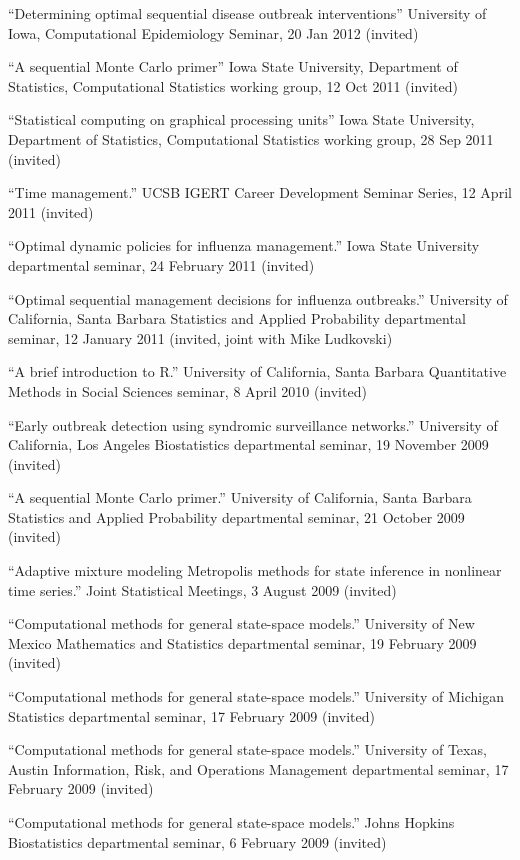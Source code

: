 \documentclass[overlapped,line]{res}
\newcommand{\sinceappt}{}
\begin{document}
\begin{resume}
{``Determining optimal sequential disease outbreak interventions'' University of Iowa, Computational Epidemiology Seminar, 20 Jan 2012 (invited)

\sinceappt

``A sequential Monte Carlo primer'' Iowa State University, Department of Statistics, Computational Statistics working group, 12 Oct 2011 (invited)

``Statistical computing on graphical processing units'' Iowa State University, Department of Statistics, Computational Statistics working group, 28 Sep 2011 (invited)

``Time management.'' UCSB IGERT Career Development Seminar Series, 12 April 2011 (invited)

``Optimal dynamic policies for influenza management.'' Iowa State University departmental seminar, 24 February 2011 (invited)

``Optimal sequential management decisions for influenza outbreaks.'' University of California, Santa Barbara Statistics and Applied Probability departmental seminar, 12 January 2011 (invited, joint with Mike Ludkovski)

``A brief introduction to R.'' University of California, Santa Barbara Quantitative Methods in Social Sciences seminar, 8 April 2010 (invited)

``Early outbreak detection using syndromic surveillance networks.'' University of California, Los Angeles Biostatistics departmental seminar, 19 November 2009 (invited)

``A sequential Monte Carlo primer.'' University of California, Santa Barbara Statistics and Applied Probability departmental seminar, 21 October 2009 (invited)

``Adaptive mixture modeling Metropolis methods for state inference in nonlinear time series.'' Joint Statistical Meetings, 3 August 2009 (invited)


``Computational methods for general state-space models.'' University of New Mexico Mathematics and Statistics departmental seminar, 19 February 2009 (invited)

``Computational methods for general state-space models.'' University of Michigan Statistics departmental seminar, 17 February 2009 (invited)

``Computational methods for general state-space models.'' University of Texas, Austin Information, Risk, and Operations Management departmental seminar, 17 February 2009 (invited)

``Computational methods for general state-space models.'' Johns Hopkins Biostatistics departmental seminar, 6 February 2009 (invited)

}
\end{resume}
\end{document}
